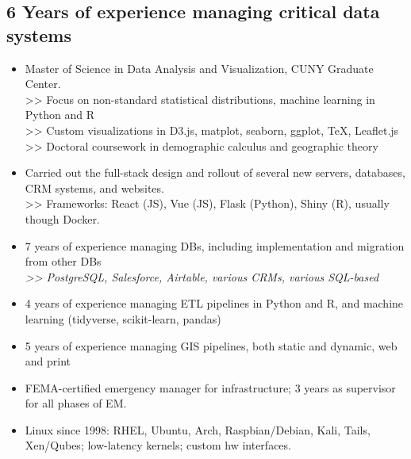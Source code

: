 \documentclass[]{deedy-resume-openfont}
\begin{document}
\subsection{6 Years of experience managing critical data systems}
\vspace{\topsep}
    \begin{itemize}
        \item Master of Science in Data Analysis and Visualization, CUNY Graduate Center. \\
        >> Focus on non-standard statistical distributions, machine learning in Python and R \\
        >> Custom visualizations in D3.js, matplot, seaborn, ggplot, \TeX, Leaflet.js \\
        >> Doctoral coursework in demographic calculus and geographic theory
        \item Carried out the full-stack design and rollout of several new servers, databases, CRM systems, and websites.
        \\>> Frameworks: React (JS), Vue (JS), Flask (Python), Shiny (R), usually though Docker.
        \item 7 years of experience managing DBs, including implementation and migration from other DBs \\ \textit{>> PostgreSQL, Salesforce, Airtable, various CRMs, various SQL-based}
        \item 4 years of experience managing ETL pipelines in Python and R, and machine learning (tidyverse, scikit-learn, pandas)
        \item 5 years of experience managing GIS pipelines, both static and dynamic, web and print
        \item FEMA-certified emergency manager for infrastructure; 3 years as supervisor for all phases of EM.
        \item Linux since 1998: RHEL, Ubuntu, Arch, Raspbian/Debian, Kali, Tails, Xen/Qubes; low-latency kernels; custom hw interfaces.
    \end{itemize}
\end{document}
